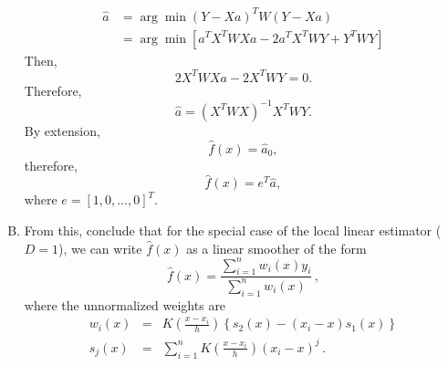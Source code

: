 \documentclass[11pt]{article}
\begin{document}
\begin{enumerate}[(A)]
\begin{align*}
    \hat{a} &= \arg \min (Y - Xa)^T W (Y - Xa) \\
    &= \arg \min [a^TX^T W X a - 2a^T X^T W Y + Y^T WY]
\end{align*}
Then,
$$2X^T W Xa - 2X^T WY = 0.$$
Therefore,
$$\hat{a} = (X^T W X)^{-1} X^T W Y.$$
By extension,
$$\hat{f} (x) = \hat{a}_0,$$
therefore, 
$$\hat{f}(x) = e^T \hat{a},$$
where $e = [1, 0, \dots, 0]^T $.

\bigskip

\item From this, conclude that for the special case of the local linear estimator ($D=1$), we can write $\hat{f}(x)$ as a linear smoother of the form
$$
\hat{f}(x) = \frac{\sum_{i=1}^n w_i(x) y_i }{\sum_{i=1}^n w_i(x)} \, ,
$$
where the unnormalized weights are
\begin{eqnarray*}
w_i(x) &=& K \left( \frac{x-x_i}{h} \right) \left\{  s_2(x) - (x_i-x) s_1(x) \right\}\\
s_j(x) &=& \sum_{i=1}^n K \left( \frac{x-x_i}{h} \right) (x_i-x)^j \, .
\end{eqnarray*}


\end{enumerate}
\end{document}
